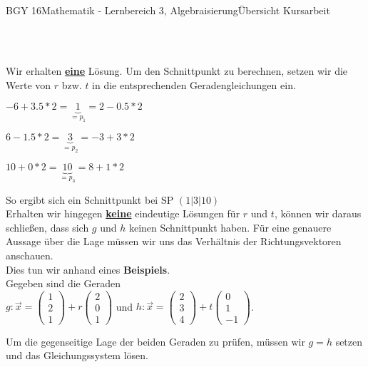 \documentclass[oneside,openany,headings=optiontotoc,11pt,numbers=noenddot]{scrreprt}
\begin{document}
\begin{worksheet}{BGY 16}{Mathematik - Lernbereich 3, Algebraisierung}{Übersicht Kursarbeit}
\begin{framed}
\begin{tabularx}{\textwidth}{lXll|lXll}
			\end{tabularx}\\
			\par\noindent
			Wir erhalten \underline{\textbf{eine}} Lösung. Um \color{codegreen}den\normalcolor{} Schnittpunkt zu berechnen, setzen wir die Werte von \(r\) bzw. \(t\) in die entsprechenden Geradengleichungen ein.\\
			\begin{center}
				\(-6 + 3.5*2= \underbrace{1}_{= p_1} = 2 - 0.5*2 \)\\
				\par\bigskip
				\(6 - 1.5*2 = \underbrace{3}_{= p_2} = -3 + 3*2\)\\
				\par\bigskip
				\(10 + 0*2 = \underbrace{10}_{= p_3} = 8+1*2\)\\
			\end{center}
			So ergibt sich ein Schnittpunkt bei SP \((1|3|10)\)\\
			Erhalten wir hingegen \underline{\textbf{keine}} eindeutige Lösungen für \(r\) und \(t\), können wir daraus schließen, dass sich \(g\) und \(h\) \color{red}keinen\normalcolor{} Schnittpunkt haben. Für eine genauere Aussage über die Lage müssen wir uns das Verhältnis der Richtungsvektoren anschauen.\\
			Dies tun wir anhand eines \textbf{Beispiels}.\\
			Gegeben sind die Geraden\\ \(g: \vec{x} = \left(\begin{array}{c}1\\2\\1\end{array}\right) + r\left(\begin{array}{c}2\\0\\1\end{array}\right)\) und \(h: \vec{x} = \left(\begin{array}{c}2\\3\\4\end{array}\right) + t\left(\begin{array}{c}0\\1\\-1\end{array}\right)\).\\
			\par\noindent
			Um die gegenseitige Lage der beiden Geraden zu prüfen, müssen wir \(g=h\) setzen und das Gleichungssystem lösen.\\

\end{framed}
\end{worksheet}
\end{document}
